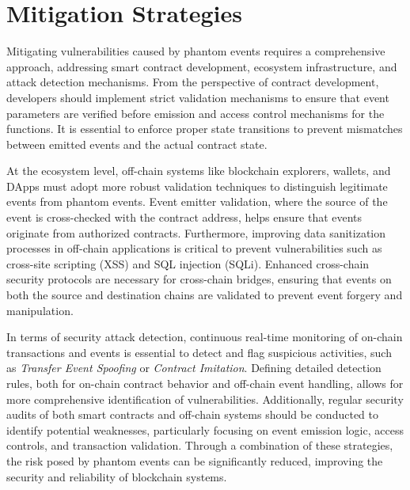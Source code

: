 \section{Mitigation Strategies}
\label{sec:mitigation}

Mitigating vulnerabilities caused by phantom events requires a comprehensive approach, addressing smart contract development, ecosystem infrastructure, and attack detection mechanisms. From the perspective of contract development, developers should implement strict validation mechanisms to ensure that event parameters are verified before emission and access control mechanisms for the functions. It is essential to enforce proper state transitions to prevent mismatches between emitted events and the actual contract state. 

At the ecosystem level, off-chain systems like blockchain explorers, wallets, and DApps must adopt more robust validation techniques to distinguish legitimate events from phantom events. Event emitter validation, where the source of the event is cross-checked with the contract address, helps ensure that events originate from authorized contracts. Furthermore, improving data sanitization processes in off-chain applications is critical to prevent vulnerabilities such as cross-site scripting (XSS) and SQL injection (SQLi). Enhanced cross-chain security protocols are necessary for cross-chain bridges, ensuring that events on both the source and destination chains are validated to prevent event forgery and manipulation.

In terms of security attack detection, continuous real-time monitoring of on-chain transactions and events is essential to detect and flag suspicious activities, such as \emph{Transfer Event Spoofing} or \emph{Contract Imitation}. Defining detailed detection rules, both for on-chain contract behavior and off-chain event handling, allows for more comprehensive identification of vulnerabilities. Additionally, regular security audits of both smart contracts and off-chain systems should be conducted to identify potential weaknesses, particularly focusing on event emission logic, access controls, and transaction validation. Through a combination of these strategies, the risk posed by phantom events can be significantly reduced, improving the security and reliability of blockchain systems.
